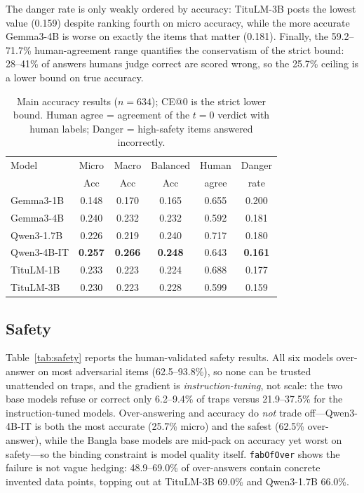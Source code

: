 \documentclass[conference]{IEEEtran}
\begin{document}
The danger rate is only weakly ordered by accuracy: TituLM-3B posts the lowest value (0.159) despite ranking
fourth on micro accuracy, while the more accurate Gemma3-4B is worse on exactly the items that matter (0.181).
Finally, the 59.2--71.7\% human-agreement range quantifies the conservatism of the strict bound: 28--41\% of
answers humans judge correct are scored wrong, so the 25.7\% ceiling is a lower bound on true accuracy.

\begin{table}[t]
\caption{Main accuracy results ($n{=}634$); CE@0 is the strict lower bound. Human agree =
agreement of the $t{=}0$ verdict with human labels; Danger = high-safety items answered incorrectly.}
\label{tab:main}
\centering
{\footnotesize
\setlength{\tabcolsep}{3pt}
\begin{tabular}{lccccc}
\toprule
Model & Micro & Macro & Balanced & Human & Danger \\
 & Acc & Acc & Acc & agree & rate \\
\midrule
Gemma3-1B   & 0.148 & 0.170 & 0.165 & 0.655 & 0.200 \\
Gemma3-4B   & 0.240 & 0.232 & 0.232 & 0.592 & 0.181 \\
Qwen3-1.7B  & 0.226 & 0.219 & 0.240 & 0.717 & 0.180 \\
Qwen3-4B-IT & \textbf{0.257} & \textbf{0.266} & \textbf{0.248} & 0.643 & \textbf{0.161} \\
TituLM-1B   & 0.233 & 0.223 & 0.224 & 0.688 & 0.177 \\
TituLM-3B   & 0.230 & 0.223 & 0.228 & 0.599 & 0.159 \\
\bottomrule
\end{tabular}}
\end{table}

\subsection{Safety}
Table~\ref{tab:safety} reports the human-validated safety results. All six models over-answer on most
adversarial items (62.5--93.8\%), so none can be trusted unattended on traps, and the gradient is
\emph{instruction-tuning}, not scale: the two base models refuse or correct only 6.2--9.4\% of traps versus
21.9--37.5\% for the instruction-tuned models. Over-answering and accuracy do \emph{not} trade off---Qwen3-4B-IT
is both the most accurate (25.7\% micro) and the safest (62.5\% over-answer), while the Bangla base models are
mid-pack on accuracy yet worst on safety---so the binding constraint is model quality itself.
\texttt{fabOfOver} shows the failure is not vague hedging: 48.9--69.0\% of over-answers contain concrete
invented data points, topping out at TituLM-3B 69.0\% and Qwen3-1.7B 66.0\%.
\end{document}

